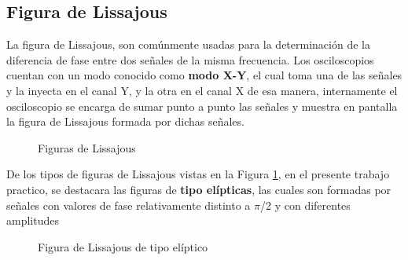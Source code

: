   \subsection{Figura de Lissajous}
               
      La figura de Lissajous, son comúnmente usadas para la determinación de la diferencia
      de fase entre dos señales de la misma frecuencia. Los osciloscopios cuentan con un modo
      conocido como \textbf{modo X-Y}, el cual toma una de las señales y la inyecta en el canal
      Y, y la otra en el canal X de esa manera, internamente el osciloscopio se encarga de 
      sumar punto a punto las señales y muestra en pantalla la figura de Lissajous formada por
      dichas señales.

         \begin{figure}[H]
            \centering
            \caption{Figuras de Lissajous}
            \label{fig:LissajTipos}                 
         \end{figure}

      De los tipos de figuras de Lissajous vistas en la Figura \ref{fig:LissajTipos}, 
      en el presente trabajo practico, se destacara las figuras de \textbf{tipo elípticas}, 
      las cuales son formadas por señales con valores de fase relativamente distinto a $\pi$/2 
      y con diferentes amplitudes

      \begin{figure}[H]
         \centering
         \caption{Figura de Lissajous de tipo elíptico}
         \label{fig:LissajElip}           
      \end{figure}

